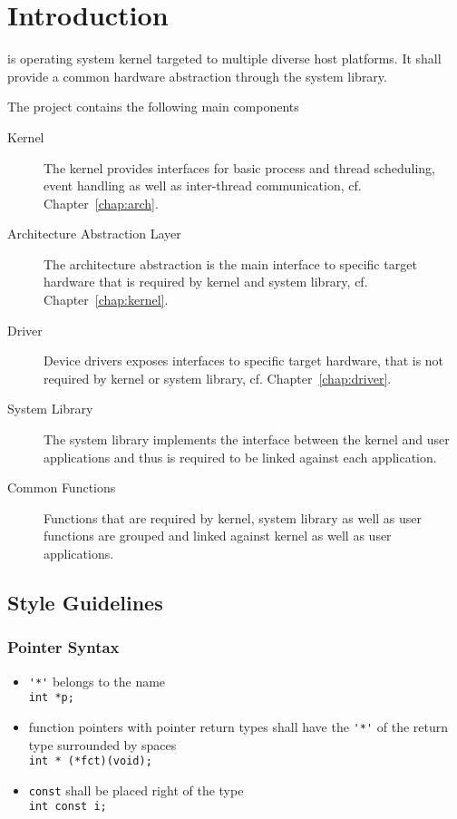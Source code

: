 %
%
%



\chapter{Introduction}
\brickos is operating system kernel targeted to multiple diverse host platforms. It shall provide a common hardware abstraction through the system library.

The project contains the following main components
\begin{description}
	\item[Kernel] The kernel provides interfaces for basic process and thread scheduling, event handling as well as inter-thread communication, cf. Chapter~\ref{chap:arch}.
	\item[Architecture Abstraction Layer] The architecture abstraction is the main interface to specific target hardware that is required by kernel and system library, cf. Chapter~\ref{chap:kernel}.
	\item[Driver] Device drivers exposes interfaces to specific target hardware, that is not required by kernel or system library, cf. Chapter~\ref{chap:driver}.
	\item[System Library] The system library implements the interface between the kernel and user applications and thus is required to be linked against each application.
	\item[Common Functions] Functions that are required by kernel, system library as well as user functions are grouped and linked against kernel as well as user applications.
\end{description}

\section{Style Guidelines}
\subsection{Pointer Syntax}
	\begin{itemize}
		\item \lstinline{'*'} belongs to the name\\
			\lstinline{int *p;}

		\item function pointers with pointer return types shall have the \lstinline{'*'} of the return type surrounded by spaces\\
		  	\lstinline{int * (*fct)(void);}

		\item \lstinline{const} shall be placed right of the type\\
			\lstinline{int const i;}
	\end{itemize}

